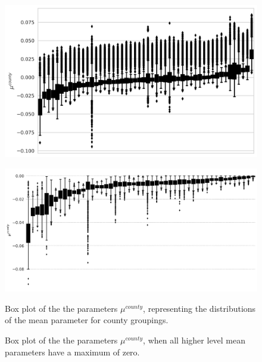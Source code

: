 \documentclass[a4paper]{article}
\begin{document}
\begin{figure}
\begin{minipage}{.45\textwidth}
  \centering
  \includegraphics[width=1\linewidth]{figures/BayCountyPlot.png}
	\label{fig:BayCountyPlot}
 \end{minipage}\qquad
\begin{minipage}{.45\textwidth}
  \centering
  \includegraphics[width=1\linewidth]{figures/BayCountyPlot_const.png}
  \label{fig:BayCountyPlot_const}
 \end{minipage}

\bigskip

\begin{minipage}[t]{.45\textwidth}
\centering
  \caption{Box plot of the the parameters $\mu^{county}$, representing the distributions of the mean parameter for county groupings.}
\end{minipage}\qquad
\begin{minipage}[t]{.45\textwidth}
\centering
  \caption{Box plot of the the parameters $\mu^{county}$, when all higher level mean parameters have a maximum of zero.}
\end{minipage}
\end{figure}
\end{document}
